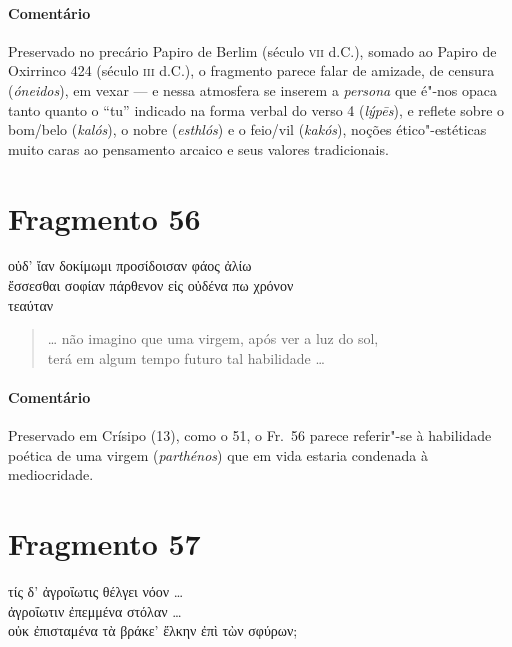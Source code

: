 {\paragraph{Comentário}
Preservado no precário Papiro de Berlim (século \textsc{vii} d.C.), somado ao Papiro de Oxirrinco 424 (século \textsc{iii} d.C.), o fragmento parece falar de amizade, de censura (\textit{óneidos}), em vexar --- e nessa atmosfera se inserem a \textit{persona} que é"-nos opaca tanto quanto o “tu” indicado na  forma verbal do verso 4 (\textit{lýpēs}), e reflete sobre o bom/belo (\textit{kalós}), o nobre (\textit{esthlós}) e o feio/vil (\textit{kakós}), noções ético"-estéticas muito caras ao pensamento arcaico e seus valores tradicionais.



\pagebreak
\section{Fragmento 56}

\begin{gkverse}
οὐδ’ ἴαν δοκίμωμι προσίδοισαν φάος ἀλίω\\
ἔσσεσθαι σοφίαν πάρθενον εἰς οὐδένα πω χρόνον\\
τεαύταν
\end{gkverse}

\begin{verse}
\ldots{} não imagino que uma virgem, após ver a luz do sol,\\
terá em algum tempo futuro tal habilidade \ldots{}
\end{verse}

{\paragraph{Comentário} Preservado em Crísipo (13), como o 51, o Fr.~56 parece referir"-se à habilidade
poética de uma virgem (\textit{parthénos}) que em vida estaria condenada à
mediocridade.}


\section{Fragmento 57}

\begin{gkverse}
τίς δ’ ἀγροΐωτις θέλγει νόον \ldots{}\\
ἀγροΐωτιν ἐπεμμένα στόλαν \ldots{}\\
οὐκ ἐπισταμένα τὰ βράκε’ ἔλκην ἐπὶ τὼν σφύρων;
\end{gkverse}

}
